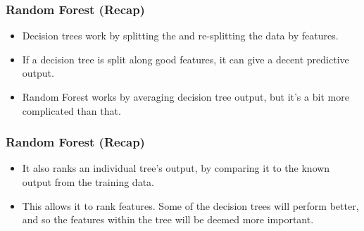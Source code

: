 \begin{frame}[fragile]\frametitle{Random Forest (Recap)}
\begin{itemize}
\item Decision trees work by splitting the and re-splitting the data by features. 
\item If a decision tree is split along good features, it can give a decent predictive output.
\item Random Forest works by averaging decision tree output, but it's a bit more complicated than that.
\end{itemize}
\end{frame}

\begin{frame}[fragile]\frametitle{Random Forest (Recap)}
\begin{itemize}
\item It also ranks an individual tree's output, by comparing it to the known output from the training data. 
\item This allows it to rank features. Some of the decision trees will perform better, and so the features within the tree will be deemed more important.
\end{itemize}
\end{frame}





